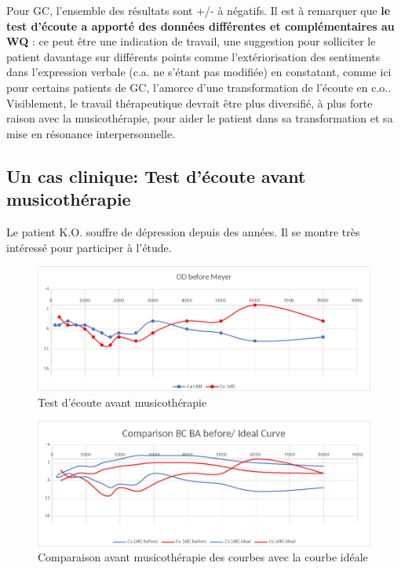                 
                Pour GC, l'ensemble des résultats sont +/- à négatifs.
Il est à remarquer que 
                 \textbf{le test d'écoute a
                apporté des données différentes et complémentaires au
                WQ} : ce peut être une indication de travail, une
              suggestion pour
              solliciter le patient davantage sur différents points
              comme l'extériorisation des sentiments dans l'expression verbale
              (c.a. ne s'étant pas modifiée)
              en constatant, comme ici pour certains patients de GC,  
                l'amorce d'une transformation de l'écoute en
                c.o.. Visiblement, le travail
                thérapeutique devrait être plus diversifié, à plus forte raison avec la musicothérapie, pour aider le
                patient dans sa transformation
               et sa mise en résonance interpersonnelle.
                

     


\subsection{Un cas clinique: Test d'écoute avant musicothérapie}

 	Le patient K.O. souffre de dépression depuis des années. Il se montre très
        intéressé pour participer à l'étude.
 
 	
 	\begin{figure}[tbh]
 		\centering
 		\includegraphics[width=0.7\linewidth]{images/clinique/od_before_meyer.png}
 		\caption{Test d'écoute avant musicothérapie}
 		\label{fig:odbeforemeyer}
 	\end{figure}
 	

	
 	\begin{figure}
 		\centering
 		\includegraphics[width=0.7\linewidth]{images/clinique/comparison_bc_ba_before_vs_ideal_curve_meyer.png}
 		\caption[Comparaison avec la courbe idéale]{Comparaison avant
                  musicothérapie des
                  courbes  avec la courbe idéale}
 		\label{fig:comparisonbcbabeforevsidealcurvemeyer}
 	\end{figure}


